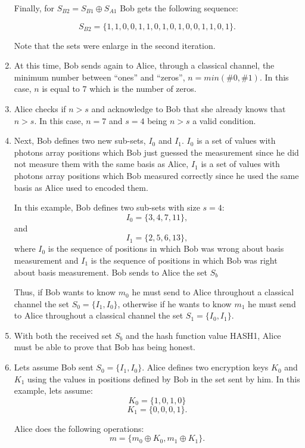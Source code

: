 \begin{enumerate}
    Finally, for $S_{B2}=S_{B1} \oplus S_{A1}$ Bob gets the following sequence:

    $$S_{B2}= \{1,1,0,0,1,1,0,1,0,1,0,0,1,1,0,1 \}.$$

    Note that the sets were enlarge in the second iteration.

  \item At this time, Bob sends again to Alice, through a classical channel, the minimum number between  ``ones'' and ``zeros'',  $n=min(\#0,\#1)$. In this case, $n$ is equal to $7$ which is the number of zeros.

  \item Alice checks if $n>s$ and acknowledge to Bob that she already knows that $n>s$. In this case, $n=7$ and $s=4$ being $n>s$ a valid condition.

  \item Next, Bob defines two new sub-sets, $I_{0}$ and $I_{1}$. $I_{0}$ is a set of values with photons array positions which Bob just guessed the measurement since he did not measure them with the same basis as Alice, $I_{1}$ is a set of values with photons array positions which Bob measured correctly since he used the same basis as Alice used to encoded them.

  In this example, Bob defines two sub-sets with size $s=4$:
  $$I_{0}=\{3,4,7,11 \},$$
  and $$I_{1}= \{2,5,6,13 \},$$ where $I_{0}$ is the sequence of positions in which Bob was wrong about basis measurement and $I_{1}$ is the sequence of positions in which Bob was right about basis measurement. Bob sends to Alice the set $S_{b}$

  Thus, if Bob wants to know $m_{0}$ he must send to Alice throughout a classical channel the set $S_{0}=\{I_{1},I_{0} \}$, otherwise if he wants to know $m_{1}$ he must send to Alice throughout a classical channel the set $S_{1}=\{I_{0},I_{1} \}$.


  \item With both the received set $S_{b}$ and the hash function value HASH1, Alice must be able to prove that Bob has being honest.

  \item Lets assume Bob sent $S_{0}=\{I_{1},I_{0} \}$.
   Alice defines two encryption keys $K_{0}$ and $K_{1}$ using the values in positions defined by Bob in the set sent by him. In this example, lets assume: $$K_{0}=\{1,0,1,0\}$$ $$K_{1}=\{0,0,0,1\}.$$

   Alice does the following operations:
   $$m = \{m_{0}\oplus K_{0}, m_{1} \oplus K_{1} \}.$$


\end{enumerate}
